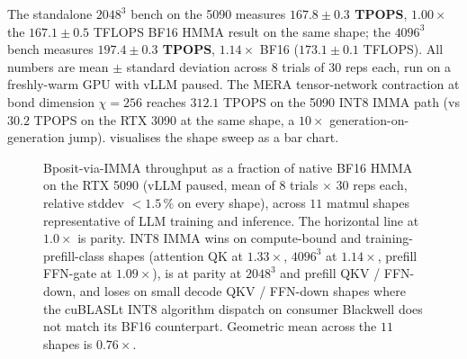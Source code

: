 \documentclass[11pt,a4paper]{article}
\newcommand{\TPOPS}{\textsf{TPOPS}}
\newcommand{\TFLOPS}{\textsf{TFLOPS}}
\begin{document}
The standalone $2048^3$ bench on the 5090 measures
\textbf{$167.8 \pm 0.3$ \TPOPS{}}, $1.00\times$ the $167.1 \pm 0.5$
\TFLOPS{} BF16 HMMA result on the same shape; the $4096^3$ bench
measures \textbf{$197.4 \pm 0.3$ \TPOPS{}}, $1.14\times$ BF16
($173.1 \pm 0.1$ \TFLOPS{}). All numbers are mean $\pm$ standard
deviation across $8$ trials of $30$ reps each, run on a freshly-warm
GPU with vLLM paused.
The MERA tensor-network contraction at bond dimension $\chi=256$
reaches $312.1$ \TPOPS{} on the 5090 INT8 IMMA path (vs
$30.2$ \TPOPS{} on the RTX 3090 at the same shape, a $10\times$
generation-on-generation jump).
 visualises the shape sweep as a bar chart.

\begin{figure}[h]
\centering
{}
\caption{Bposit-via-IMMA throughput as a fraction of native BF16
HMMA on the RTX 5090 (vLLM paused, mean of $8$ trials $\times$ $30$
reps each, relative stddev $< 1.5\,\%$ on every shape), across $11$
matmul shapes representative of LLM training and inference. The
horizontal line at $1.0\times$ is parity. INT8 IMMA wins on
compute-bound and training-prefill-class shapes (attention QK at
$1.33\times$, $4096^3$ at $1.14\times$, prefill FFN-gate at
$1.09\times$), is at parity at $2048^3$ and prefill QKV / FFN-down,
and loses on small decode QKV / FFN-down shapes where the cuBLASLt
INT8 algorithm dispatch on consumer Blackwell does not match its BF16
counterpart. Geometric mean across the $11$ shapes is $0.76\times$.}
\label{fig:matmul-bars}
\end{figure}
\end{document}
